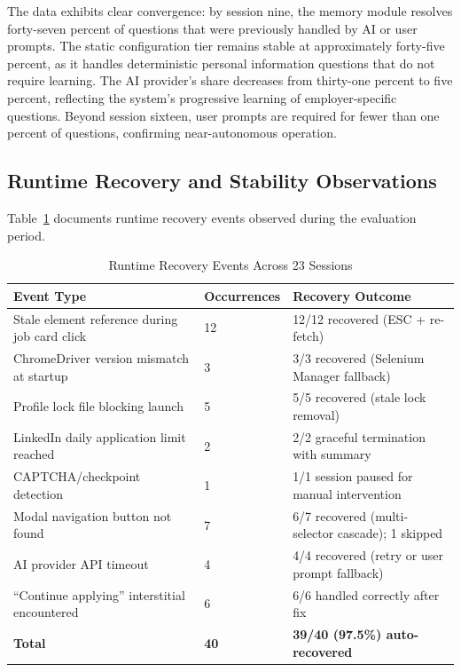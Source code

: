 \documentclass[12pt, a4paper, oneside]{report}
\begin{document}
The data exhibits clear convergence: by session nine, the memory module resolves forty-seven percent of questions that were previously handled by AI or user prompts. The static configuration tier remains stable at approximately forty-five percent, as it handles deterministic personal information questions that do not require learning. The AI provider's share decreases from thirty-one percent to five percent, reflecting the system's progressive learning of employer-specific questions. Beyond session sixteen, user prompts are required for fewer than one percent of questions, confirming near-autonomous operation.

\subsection{Runtime Recovery and Stability Observations}

Table~\ref{tab:exp-recovery} documents runtime recovery events observed during the evaluation period.

\begin{table}[H]
\centering
\caption{Runtime Recovery Events Across 23 Sessions}
\label{tab:exp-recovery}
\small
\begin{tabularx}{\textwidth}{|l|X|X|}
\hline
\textbf{Event Type} & \textbf{Occurrences} & \textbf{Recovery Outcome} \\
\hline
Stale element reference during job card click & 12 & 12/12 recovered (ESC + re-fetch) \\
\hline
ChromeDriver version mismatch at startup & 3 & 3/3 recovered (Selenium Manager fallback) \\
\hline
Profile lock file blocking launch & 5 & 5/5 recovered (stale lock removal) \\
\hline
LinkedIn daily application limit reached & 2 & 2/2 graceful termination with summary \\
\hline
CAPTCHA/checkpoint detection & 1 & 1/1 session paused for manual intervention \\
\hline
Modal navigation button not found & 7 & 6/7 recovered (multi-selector cascade); 1 skipped \\
\hline
AI provider API timeout & 4 & 4/4 recovered (retry or user prompt fallback) \\
\hline
``Continue applying'' interstitial encountered & 6 & 6/6 handled correctly after fix \\
\hline
\textbf{Total} & \textbf{40} & \textbf{39/40 (97.5\%) auto-recovered} \\
\hline
\end{tabularx}
\end{table}
\end{document}
